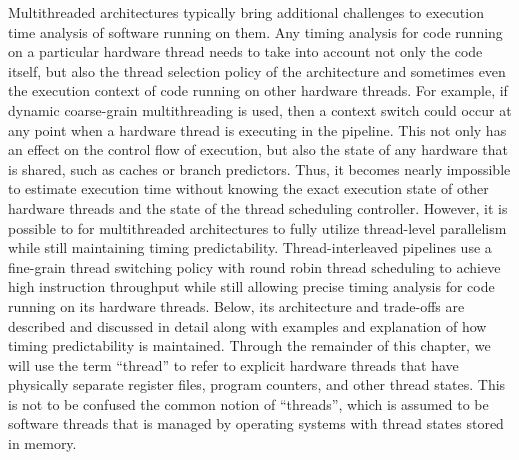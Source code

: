 Multithreaded architectures typically bring additional challenges to execution time analysis of software running on them.
Any timing analysis for code running on a particular hardware thread needs to take into account not only the code itself, but also the thread selection policy of the architecture and sometimes even the execution context of code running on other hardware threads.
For example, if dynamic coarse-grain multithreading is used, then a context switch could occur at any point when a hardware thread is executing in the pipeline.
This not only has an effect on the control flow of execution, but also the state of any hardware that is shared, such as caches or branch predictors.    
Thus, it becomes nearly impossible to estimate execution time without knowing the exact execution state of other hardware threads and the state of the thread scheduling controller.
However, it is possible to for multithreaded architectures to fully utilize thread-level parallelism while still maintaining timing predictability.
Thread-interleaved pipelines use a fine-grain thread switching policy with round robin thread scheduling to achieve high instruction throughput while still allowing precise timing analysis for code running on its hardware threads. 
Below, its architecture and trade-offs are described and discussed in detail along with examples and explanation of how timing predictability is maintained.
Through the remainder of this chapter, we will use the term ``thread'' to refer to explicit hardware threads that have physically separate register files, program counters, and other thread states.
This is not to be confused the common notion of ``threads'', which is assumed to be software threads that is managed by operating systems with thread states stored in memory.

